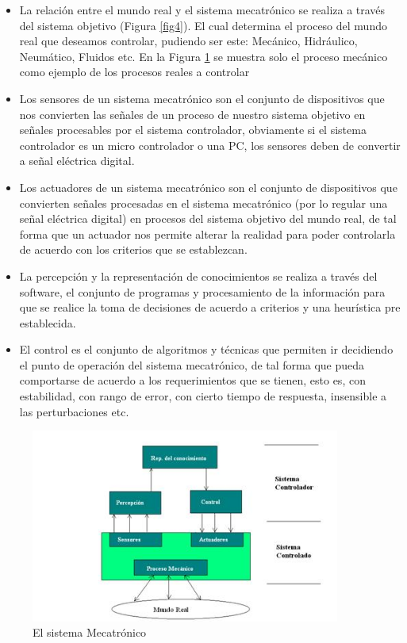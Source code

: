 \documentclass[12pt]{book}
\theoremstyle{definition}
\theoremstyle{remark}
\theoremstyle{plain}
\begin{document}
\begin{itemize}
\item 	La relación entre el mundo real y el sistema mecatrónico se realiza a través del sistema objetivo (Figura \ref{fig4}). El cual determina el proceso del mundo real que deseamos controlar, pudiendo ser este: Mecánico, Hidráulico, Neumático, Fluidos etc. En la Figura \ref{fig5} se muestra solo el proceso mecánico como ejemplo de los procesos reales a controlar
\item Los sensores de un sistema mecatrónico son el conjunto de dispositivos que nos convierten las señales de un proceso de nuestro sistema objetivo en señales procesables por el sistema controlador, obviamente si el sistema controlador es un micro controlador o una PC, los sensores deben de convertir a señal eléctrica digital.
\item Los actuadores de un sistema mecatrónico son el conjunto de dispositivos que convierten señales procesadas en el sistema mecatrónico (por lo regular una señal eléctrica digital) en procesos del sistema objetivo del mundo real, de tal forma que un actuador nos permite alterar la realidad para poder controlarla de acuerdo con los criterios que se establezcan.
\item La percepción y la representación de conocimientos se realiza a través del software, el conjunto de programas y procesamiento de la información para que se realice la toma de decisiones de acuerdo a criterios y una heurística pre establecida.
\item El control es el conjunto de algoritmos y técnicas que permiten ir decidiendo el punto de operación del sistema mecatrónico, de tal forma que pueda comportarse de acuerdo a los requerimientos que se tienen, esto es, con estabilidad, con rango de error, con cierto tiempo de respuesta, insensible a las perturbaciones etc.
\end{itemize}

\begin{figure}
\centering
\includegraphics[width=4in]{sistemamecatronico2.jpg}
\caption{El sistema Mecatrónico}
\label{fig5}
\end{figure}
\end{document}

